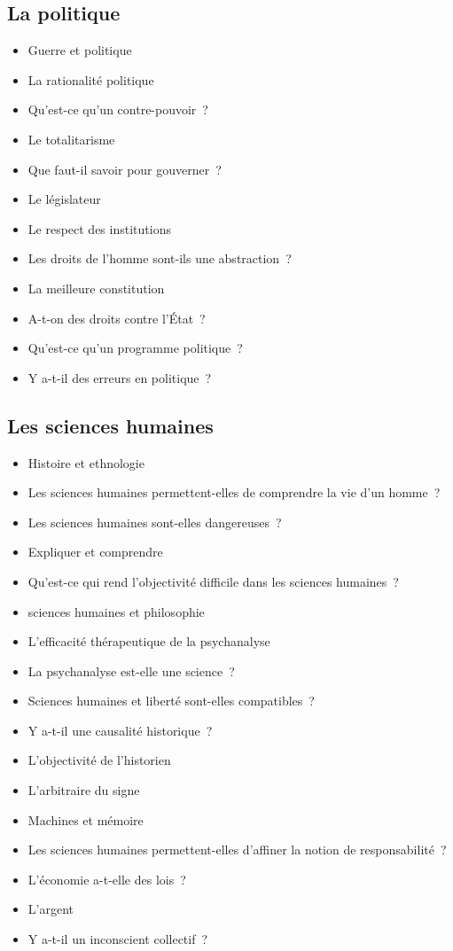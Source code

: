 \documentclass[a4paper,11pt]{article}
\newenvironment{liste}{\begin{itemize}}{\end{itemize}}
\begin{document}
\subsection{La politique}

\begin{liste}
\item Guerre et politique
\item La rationalité politique
\item Qu'est-ce qu'un contre-pouvoir~?
\item Le totalitarisme
\item Que faut-il savoir pour gouverner~?
\item Le législateur
\item Le respect des institutions
\item Les droits de l'homme sont-ils une abstraction~?
\item La meilleure constitution
\item A-t-on des droits contre l'État~?
\item Qu'est-ce qu'un programme politique~?
\item Y a-t-il des erreurs en politique~?
\end{liste}


\subsection{Les sciences humaines}

\begin{liste}
\item Histoire et ethnologie
\item Les sciences humaines permettent-elles de comprendre la vie d'un
  homme~?
\item Les sciences humaines sont-elles dangereuses~?
\item Expliquer et comprendre
\item Qu'est-ce qui rend l'objectivité difficile dans les sciences
  humaines~?
\item sciences humaines et philosophie
\item L'efficacité thérapeutique de la psychanalyse
\item La psychanalyse est-elle une science~?
\item Sciences humaines et liberté sont-elles compatibles~?
\item Y a-t-il une causalité historique~?
\item L'objectivité de l'historien
\item L'arbitraire du signe
\item Machines et mémoire
\item Les sciences humaines permettent-elles d'affiner la notion de
  responsabilité~?
\item L'économie a-t-elle des lois~?
\item L'argent
\item Y a-t-il un inconscient collectif~? 
\end{liste}
\end{document}
